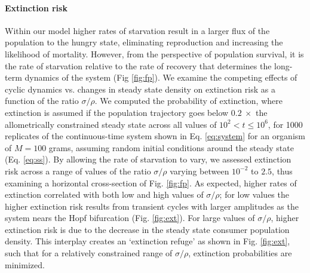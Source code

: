 \documentclass{pnastwo}
\begin{document}
\begin{article}
\paragraph{Extinction risk}
Within our model higher rates of starvation result in a larger flux of the population to the hungry state, eliminating reproduction and increasing the likelihood of mortality. However, from the perspective of population survival, it is the rate of starvation relative to the rate of recovery that determines the long-term dynamics of the system (Fig \ref{fig:fp}). We examine the competing effects of cyclic dynamics vs. changes in steady state density on extinction risk as a function of the ratio $\sigma/\rho$.
We computed the probability of extinction, where extinction is assumed if the population trajectory goes below $0.2~\times$ the allometrically constrained steady state across all values of $10^2<t\leq 10^6$, for 1000 replicates of the continuous-time system shown in Eq. \ref{eq:system} for an organism of $M=100$ grams, assuming random initial conditions around the steady state (Eq. \ref{eq:ss}). %
By allowing the rate of starvation to vary, we assessed extinction risk across a range of values of the ratio $\sigma/\rho$ varying between $10^{-2}$ to $2.5$, thus examining a horizontal cross-section of Fig. \ref{fig:fp}.
As expected, higher rates of extinction correlated with both low and high values of $\sigma/\rho$; for low values the higher extinction risk results from transient cycles with larger amplitudes as the system nears the Hopf bifurcation (Fig. \ref{fig:ext}).
For large values of $\sigma/\rho$, higher extinction risk is due to the decrease in the steady state consumer population density.
This interplay creates an `extinction refuge' as shown in Fig. \ref{fig:ext}, such that for a relatively constrained range of $\sigma/\rho$, extinction probabilities are minimized.


\end{article}
\end{document}
